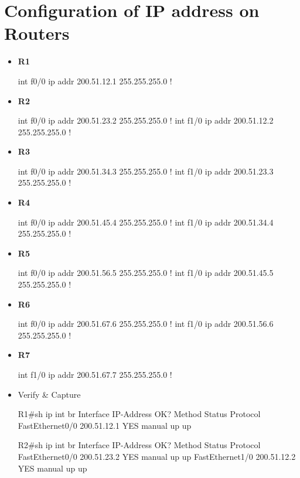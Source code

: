 \documentclass[10pt]{article}
\begin{document}
\section{Configuration of IP address on Routers}
\begin{itemize}
\item {\bf R1}
\begin{verbatim*}
int f0/0
 ip addr 200.51.12.1 255.255.255.0
!
\end{verbatim*}
\item {\bf R2}
\begin{verbatim*}
int f0/0
 ip addr 200.51.23.2 255.255.255.0
!
int f1/0
 ip addr 200.51.12.2 255.255.255.0
!
\end{verbatim*}
\item {\bf R3}
\begin{verbatim*}
int f0/0
 ip addr 200.51.34.3 255.255.255.0
!
int f1/0
 ip addr 200.51.23.3 255.255.255.0
!
\end{verbatim*}
\item {\bf R4}
\begin{verbatim*}
int f0/0
 ip addr 200.51.45.4 255.255.255.0
!
int f1/0
 ip addr 200.51.34.4 255.255.255.0
!
\end{verbatim*}
\item {\bf R5}
\begin{verbatim*}
int f0/0
 ip addr 200.51.56.5 255.255.255.0
!
int f1/0
 ip addr 200.51.45.5 255.255.255.0
!
\end{verbatim*}
\item {\bf R6}
\begin{verbatim*}
int f0/0
 ip addr 200.51.67.6 255.255.255.0
!
int f1/0
 ip addr 200.51.56.6 255.255.255.0
!
\end{verbatim*}
\item {\bf R7}
\begin{verbatim*}
int f1/0
 ip addr 200.51.67.7 255.255.255.0
!
\end{verbatim*}
\item {Verify \& Capture}
\begin{verbatim*}
R1#sh ip int br
Interface                  IP-Address      OK? Method Status                Protocol
FastEthernet0/0            200.51.12.1     YES manual up                    up  

R2#sh ip int br
Interface                  IP-Address      OK? Method Status                Protocol
FastEthernet0/0            200.51.23.2     YES manual up                    up  
FastEthernet1/0            200.51.12.2     YES manual up                    up  


\end{verbatim*}
\end{itemize}
\end{document}
